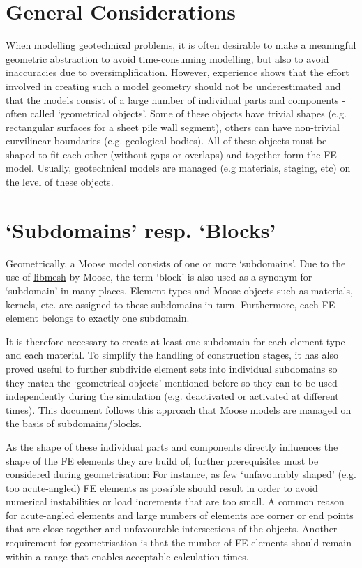 \section{General Considerations}
\label{geometry-general}

When modelling geotechnical problems, it is often desirable to make a
meaningful geometric abstraction to avoid time-consuming modelling, but also to
avoid inaccuracies due to oversimplification. However, experience shows that
the effort involved in creating such a model geometry should not be
underestimated and that the models consist of a large number of individual
parts and components - often called ‘geometrical objects’. Some of these
objects have trivial shapes (e.g. rectangular surfaces for a sheet pile wall
segment), others can have non-trivial curvilinear boundaries (e.g. geological
bodies). All of these objects must be shaped to fit each other (without gaps or
overlaps) and together form the FE model. Usually, geotechnical models are
managed (e.g materials, staging, etc) on the level of these objects.

\section{‘Subdomains’ resp. ‘Blocks’}
\label{geometry-blocks-and-subdomains}

Geometrically, a Moose model consists of one or more ‘subdomains’. Due to the
use of \href{https://libmesh.github.io/}{libmesh} by Moose, the term ‘block’ is
also used as a synonym for ‘subdomain’ in many places. Element types and Moose
objects such as materials, kernels, etc. are assigned to these subdomains in
turn. Furthermore, each FE element belongs to exactly one subdomain.

It is therefore necessary to create at least one subdomain for each element
type and each material. To simplify the handling of construction stages, it has
also proved useful to further subdivide element sets into individual subdomains
so they match the ‘geometrical objects’ mentioned before so they can to be used
independently during the simulation (e.g. deactivated or activated at different
times). This document follows this approach that Moose models are managed on
the basis of subdomains/blocks.

As the shape of these individual parts and components directly influences the
shape of the FE elements they are build of, further prerequisites must be
considered during geometrisation: For instance, as few ‘unfavourably shaped’
(e.g. too acute-angled) FE elements as possible should result in order to avoid
numerical instabilities or load increments that are too small. A common reason
for acute-angled elements and large numbers of elements are corner or end
points that are close together and unfavourable intersections of the objects.
Another requirement for geometrisation is that the number of FE elements should
remain within a range that enables acceptable calculation times.

